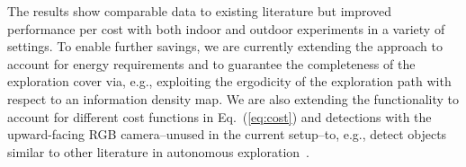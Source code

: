 \documentclass[lettersize,journal]{IEEEtran}
\theoremstyle{definition}
\begin{document}
The results show comparable data to existing literature but improved performance per cost with both indoor and outdoor experiments in a variety of settings. To enable further savings, we are currently extending the approach to account for energy requirements and to guarantee the completeness of the exploration cover via, e.g., exploiting the ergodicity of the exploration path with respect to an information density map.
We are also extending the functionality to account for different cost functions in Eq.~(\ref{eq:cost}) and detections with the upward-facing RGB camera--unused in the current setup--to, e.g., detect objects similar to other literature in autonomous exploration~\cite{kulkarni2022autonomous,tranzatto2022cerberus,roucek2020darpa,ebadi2020lamp}.








\end{document}
